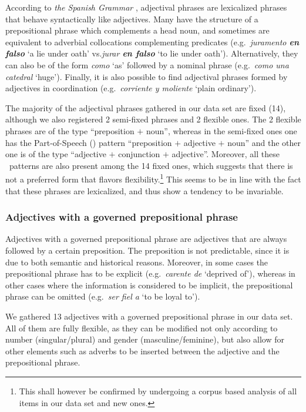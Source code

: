 \documentclass[output=paper]{langsci/langscibook}
\begin{document}
According to \textit{the Spanish Grammar} \citeyearpar[261]{RAE:2010}, adjectival phrases are lexicalized phrases that behave syntactically like adjectives. 
Many have the structure of a prepositional phrase which complements a head noun, and sometimes are equivalent to adverbial collocations complementing predicates (e.g.\ \textit{juramento \textbf{en falso}} `a lie under oath' vs.\@ \textit{jurar \textbf{en falso}} `to lie under oath').
Alternatively, they can also be of the form \textit{como} `as' followed by a nominal phrase (e.g.\ \textit{como una catedral} `huge').
Finally, it is also possible to find adjectival phrases formed by adjectives in coordination (e.g.\ \textit{corriente y moliente} `plain ordinary').

The majority of the adjectival phrases gathered in our data set are fixed (14), although we also registered 2 semi-fixed phrases and 2 flexible ones.
The 2 flexible phrases are of the type ``preposition $+$ noun'', whereas in the semi-fixed ones one has the Part-of-Speech (\pos) pattern ``preposition $+$ adjective $+$ noun'' and the other one is of the type ``adjective $+$ conjunction $+$ adjective''.
Moreover, all these \pos\ patterns are also present among the 14 fixed ones, which suggests that there is not a preferred form that flavors flexibility.\footnote{This shall however be confirmed by undergoing a corpus based analysis of all items in our data set and new ones.}
This seems to be in line with the fact that these phrases are lexicalized, and thus show a tendency to be invariable.

\subsubsection{Adjectives with a governed prepositional phrase}
\label{ssssec:adjs_with_PP}

Adjectives with a governed prepositional phrase are adjectives that are always followed by a certain preposition.
The preposition is not predictable, since it is due to both semantic and historical reasons.
Moreover, in some cases the prepositional phrase has to be explicit (e.g.\ \textit{carente de} `deprived of'), whereas in other cases where the information is considered to be implicit, the prepositional phrase can be omitted (e.g.\ \textit{ser fiel a} `to be loyal to').

We gathered 13 adjectives with a governed prepositional phrase in our data set.
All of them are fully flexible, as they can be modified not only according to number (singular/plural) and gender (masculine/feminine), but also allow for other elements such as adverbs to be inserted between the adjective and the prepositional phrase.
\end{document}
